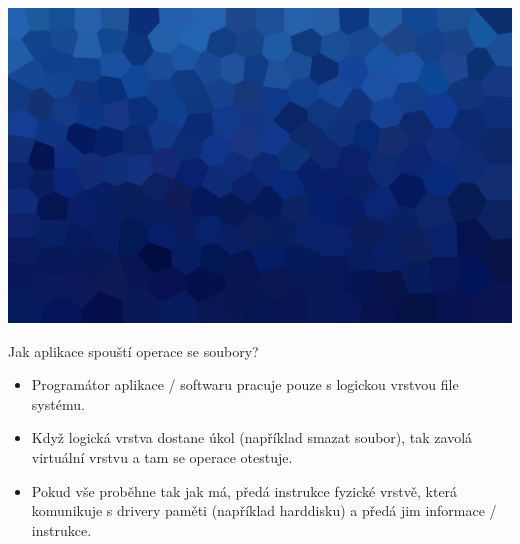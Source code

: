 \documentclass[aspectratio=169,xcolor=dvipsnames, t]{beamer}
\begin{document}
{
{
    \includegraphics[width=\paperwidth,height=\paperheight]{AICStyleData/logos/mene_polygonu_bg.png}
}
\begin{frame}{Jak aplikace spouští operace se soubory?}
\begin{itemize}
    \item Programátor aplikace / softwaru pracuje pouze s logickou vrstvou file systému. 
    \item Když logická vrstva dostane úkol (například smazat soubor), tak zavolá virtuální vrstvu a tam se operace otestuje.
    \item Pokud vše proběhne tak jak má, předá instrukce fyzické vrstvě, která komunikuje s drivery paměti (například harddisku) a předá jim informace / instrukce.
\end{itemize}
    
\end{frame}


}
\end{document}
